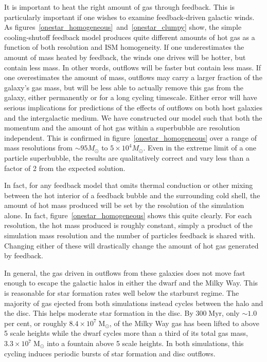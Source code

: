 It is important to heat the right amount of gas through feedback. This is
particularly important if one wishes to examine feedback-driven galactic winds.
As figures~\ref{onestar_homogeneous}~and~\ref{onestar_clumpy} show, the simple
cooling-shutoff feedback model produces quite different amounts of hot gas as a
function of both resolution and ISM homogeneity.  If one underestimates the
amount of mass heated by feedback, the winds one drives will be hotter, but
contain less mass.  In other words, outflows will be faster but contain less
mass.  If one overestimates the amount of mass, outflows may carry a larger
fraction of the galaxy's gas mass, but will be less able to actually remove
this gas from the galaxy, either permanently or for a long cycling timescale.
Either error will have  serious implications for predictions of the effects of
outflows on both host galaxies and the intergalactic medium.  We have
constructed our model such that both the momentum and the amount of hot gas
within a superbubble are resolution independent.  This is confirmed in
figure~\ref{onestar_homogeneous} over a range of mass 
resolutions from $\sim95M_\odot$ to $5\times10^4M_\odot$.  
Even in the extreme limit of a one particle superbubble,
the results are qualitatively correct and vary less than a factor of 2
from the expected solution.

In fact, for any feedback model that omits thermal conduction or other mixing
between the hot interior of a feedback bubble and the surrounding cold shell,
the amount of hot mass produced will be set by the resolution of the simulation
alone.  In fact, figure~\ref{onestar_homogeneous} shows this quite clearly.  For
each resolution, the hot mass produced is roughly constant, simply a product of
the simulation mass resolution and the number of particles feedback is shared
with.  Changing either of these will drastically change the amount of hot gas
generated by feedback.  

In general, the gas driven in outflows from these galaxies does not move fast
enough to escape the galactic halos in either the dwarf and the Milky Way.  This
is reasonable for star formation rates well below the starburst regime.  The
majority of gas ejected from both simulations instead cycles between the halo
and the disc.  This helps moderate star formation in the disc.  By
$300\;\mathrm{Myr}$, only $\sim 1.0$ per cent, or roughly
$8.4\times10^7\;\mathrm{M_\odot}$, of the Milky Way gas has been lifted to above
5 scale heights while the dwarf cycles more than a third of its total gas mass,
$3.3\times10^7\; \mathrm{M_\odot}$ into a fountain above 5 scale heights.  In
both simulations, this cycling induces periodic bursts of star formation and
disc outflows.


